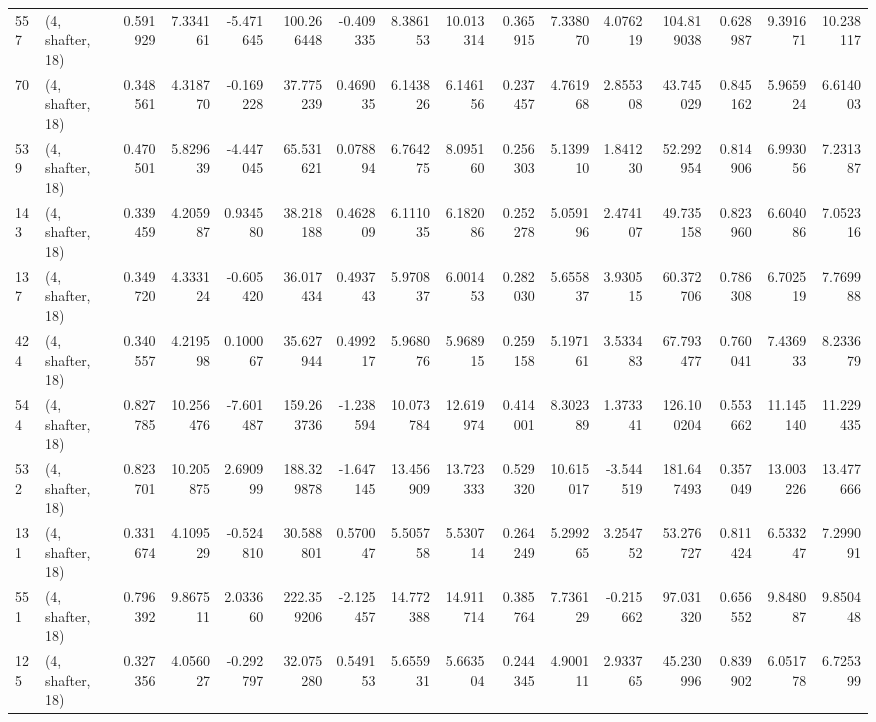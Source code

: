 \begin{tabular}{llrrrrrrrrrrrrrr}
557 &  (4, shafter, 18) &   0.591929 &   7.334161 &  -5.471645 &   100.266448 &  -0.409335 &   8.386153 &  10.013314 &  0.365915 &   7.338070 &   4.076219 &    104.819038 &   0.628987 &   9.391671 &   10.238117 \\
70  &  (4, shafter, 18) &   0.348561 &   4.318770 &  -0.169228 &    37.775239 &   0.469035 &   6.143826 &   6.146156 &  0.237457 &   4.761968 &   2.855308 &     43.745029 &   0.845162 &   5.965924 &    6.614003 \\
539 &  (4, shafter, 18) &   0.470501 &   5.829639 &  -4.447045 &    65.531621 &   0.078894 &   6.764275 &   8.095160 &  0.256303 &   5.139910 &   1.841230 &     52.292954 &   0.814906 &   6.993056 &    7.231387 \\
143 &  (4, shafter, 18) &   0.339459 &   4.205987 &   0.934580 &    38.218188 &   0.462809 &   6.111035 &   6.182086 &  0.252278 &   5.059196 &   2.474107 &     49.735158 &   0.823960 &   6.604086 &    7.052316 \\
137 &  (4, shafter, 18) &   0.349720 &   4.333124 &  -0.605420 &    36.017434 &   0.493743 &   5.970837 &   6.001453 &  0.282030 &   5.655837 &   3.930515 &     60.372706 &   0.786308 &   6.702519 &    7.769988 \\
424 &  (4, shafter, 18) &   0.340557 &   4.219598 &   0.100067 &    35.627944 &   0.499217 &   5.968076 &   5.968915 &  0.259158 &   5.197161 &   3.533483 &     67.793477 &   0.760041 &   7.436933 &    8.233679 \\
544 &  (4, shafter, 18) &   0.827785 &  10.256476 &  -7.601487 &   159.263736 &  -1.238594 &  10.073784 &  12.619974 &  0.414001 &   8.302389 &   1.373341 &    126.100204 &   0.553662 &  11.145140 &   11.229435 \\
532 &  (4, shafter, 18) &   0.823701 &  10.205875 &   2.690999 &   188.329878 &  -1.647145 &  13.456909 &  13.723333 &  0.529320 &  10.615017 &  -3.544519 &    181.647493 &   0.357049 &  13.003226 &   13.477666 \\
131 &  (4, shafter, 18) &   0.331674 &   4.109529 &  -0.524810 &    30.588801 &   0.570047 &   5.505758 &   5.530714 &  0.264249 &   5.299265 &   3.254752 &     53.276727 &   0.811424 &   6.533247 &    7.299091 \\
551 &  (4, shafter, 18) &   0.796392 &   9.867511 &   2.033660 &   222.359206 &  -2.125457 &  14.772388 &  14.911714 &  0.385764 &   7.736129 &  -0.215662 &     97.031320 &   0.656552 &   9.848087 &    9.850448 \\
125 &  (4, shafter, 18) &   0.327356 &   4.056027 &  -0.292797 &    32.075280 &   0.549153 &   5.655931 &   5.663504 &  0.244345 &   4.900111 &   2.933765 &     45.230996 &   0.839902 &   6.051778 &    6.725399 \\

\end{tabular}
